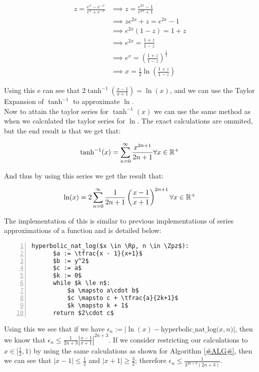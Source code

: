 \begin{align*}
z = \frac{e^x - e^{-x}}{e^x + e^{-x}} 
	&\implies z = \frac{e^{2x} - 1}{e^{2x} + 1}\\
	&\implies ze^{2x} + z = e^{2x} - 1\\
	&\implies e^{2x}(1 - z)=1+z\\
	&\implies e^{2x} = \frac{1+z}{1-z}\\
	&\implies e^{x} = \left(\frac{1+z}{1-z}\right)^{\frac{1}{2}}\\
	&\implies x = \frac{1}{2}\ln\left(\frac{1+z}{1-z}\right)
\end{align*}

Using this e can see that \(2\tanh^{-1}\left(\frac{x-1}{x+1}\right) = \ln(x)\), and we can use the Taylor Expansion of \(\tanh^{-1}\) to approximate \(\ln\).\\

Now to attain the taylor series for \(\tanh^{-1}(x)\) we can use the same method as when we calculated the taylor series for \(\ln\). The exact calculations are ommited, but the end result is that we get that:

\[\tanh^{-1}(x) = \sum_{n=0}^\infty\frac{x^{2n+1}}{2n+1} \forall x \in \mathbb{R}^+\]

And thus by using this series we get the result that:

\[\ln(x) = 2\sum_{n=0}^\infty\frac{1}{2n+1}\left(\frac{x-1}{x+1}\right)^{2n+1}\forall x \in \mathbb{R}^+\]

The implementation of this is similar to previous implementations of series approximations of a function and is detailed below:

\begin{lstlisting}[numbers=left,frame=single,mathescape,caption={Hyperbolic seies method for \(\ln\)},label={PCD_"hyperbolic ln"}]
  hyperbolic_nat_log($x \in \Rp, n \in \Zpz$):
      $a := \tfrac{x - 1}{x+1}$
      $b := y^2$
      $c := a$
      $k := 0$
      while $k \le n$:
          $a \mapsto a\cdot b$
          $c \mapsto c + \tfrac{a}{2k+1}$
          $k \mapsto k + 1$
      return $2\cdot c$
\end{lstlisting}

Using this we see that if we have \(\epsilon_n := |\ln(x) - \textrm{hyperbolic\_nat\_log(}x, n\textrm{)}|\), then we know that \(\epsilon_n \le \frac{1}{2n + 3}\left|\frac{x-1}{x+1}\right|^{2n+3}\). If we consider restricting our calculations to \(x \in [\tfrac{1}{2}, 1)\) by using the  same calculations as shown for Algorithm \ref{#ALG#}, then we can see that \(|x - 1| \le \frac{1}{2}\) and \(|x+1| \ge \frac{3}{2}\); therefore \(\epsilon_n \le \frac{1}{3^{2n+3}(2n+3)}\).\\

